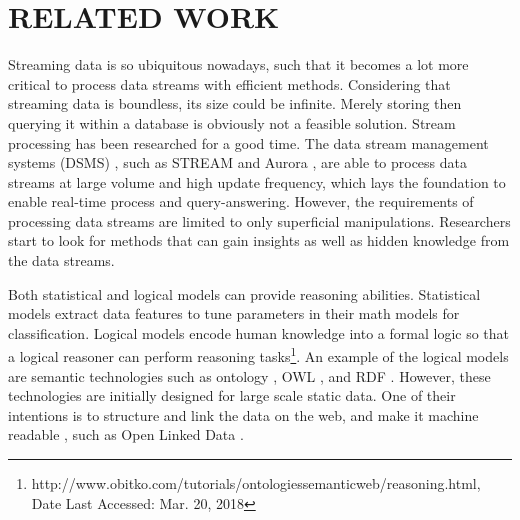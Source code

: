 
\chapter{RELATED WORK}
Streaming data is so ubiquitous nowadays, such that it becomes a lot more critical to process data streams with efficient methods.
Considering that streaming data is boundless, its size could be infinite. 
Merely storing then querying it within a database is obviously not a feasible solution.
Stream processing \cite{stephens1997survey} has been researched for a good time.
The data stream management systems (DSMS) \cite{cugola2012processing}, such as STREAM \cite{arasu2003stream} and Aurora \cite{abadi2003aurora}, are able to process data streams at large volume and high update frequency, which lays the foundation to enable real-time process and query-answering. 
However, the requirements of processing data streams are limited to only superficial manipulations.
Researchers start to look for methods that can gain insights as well as hidden knowledge from the data streams.

Both statistical and logical models can provide reasoning abilities. 
Statistical models extract data features to tune parameters in their math models for classification. 
Logical models encode human knowledge into a formal logic so that a logical reasoner can perform reasoning tasks\footnote{http://www.obitko.com/tutorials/ontologies\-semantic\-web/reasoning.html, Date Last Accessed: Mar. 20, 2018}.
An example of the logical models are semantic technologies such as ontology \cite{noy2001ontology}, OWL \cite{bechhofer2009owl}, and RDF \cite{lassila1999resource}.
However, these technologies are initially designed for large scale static data.
One of their intentions is to structure and link the data on the web, and make it machine readable \cite{berners2001semantic}, such as Open Linked Data \cite{bizer2009linked}.

